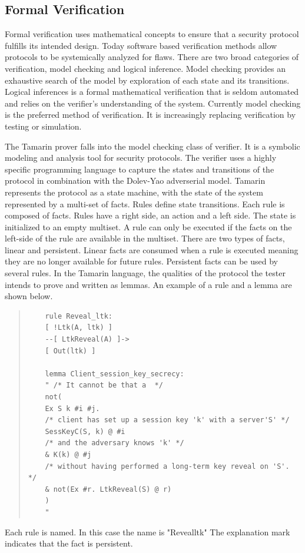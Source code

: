 \documentclass[10pt, pdftex]{article}
\begin{document}
\subsection{Formal Verification}
Formal verification uses mathematical concepts to ensure that a security protocol fulfills its intended design.  Today software based verification methods allow protocols to be systemically analyzed for flaws. There are two broad categories of verification, model checking and logical inference.  Model checking provides an exhaustive search of the model by exploration of each state and its transitions.  Logical inferences is a formal mathematical verification that is seldom automated and relies on the verifier's understanding of the system.  Currently model checking is the preferred method of verification.  It is increasingly replacing verification by  testing or simulation.  

The Tamarin prover falls into the model checking class of verifier.  It is a symbolic modeling and analysis tool for security protocols.  The verifier uses a highly specific programming language to capture the states and transitions of the protocol in combination with the Dolev-Yao adverserial model.  Tamarin represents the protocol as a state machine, with the state of the system represented by a multi-set of facts.  Rules define state transitions.  Each rule is composed of facts.  Rules have a right side, an action and a left side.  The state is initialized to an empty multiset.  A rule can only be executed if the facts on the left-side of the rule are available in the multiset.  There are two types of facts, linear and persistent.  Linear facts are consumed when a rule is executed meaning they are no longer available for future rules.  Persistent facts can be used by several rules.  In the Tamarin language, the qualities of the protocol the tester intends to prove and written as lemmas.  An example of a rule and a lemma are shown below.

\begin{quote}
	\begin{verbatim}
	rule Reveal_ltk:
	[ !Ltk(A, ltk) ]
	--[ LtkReveal(A) ]->
	[ Out(ltk) ]
	
	lemma Client_session_key_secrecy:
	" /* It cannot be that a  */
	not(
	Ex S k #i #j.
	/* client has set up a session key 'k' with a server'S' */
	SessKeyC(S, k) @ #i
	/* and the adversary knows 'k' */
	& K(k) @ #j
	/* without having performed a long-term key reveal on 'S'. */
	& not(Ex #r. LtkReveal(S) @ r)
	)
	"
	\end{verbatim}
\end{quote} Each rule is named.  In this case the name is "Reveal\textunderscore ltk"  The explanation mark indicates that the fact is persistent.  

  

 


     
\nocite{*}


\end{document}
